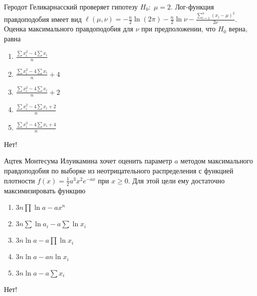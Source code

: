 \documentclass[t]{beamer}
\begin{document}
 \begin{frame} \label{20-No} 
\begin{block}{20} 

Геродот Геликарнасский проверяет гипотезу $H_0: \; \mu=2$. Лог-функция правдоподобия имеет вид $\ell(\mu,\nu)=-\frac{n}{2}\ln (2\pi)-\frac{n}{2}\ln \nu -\frac{\sum_{i=1}^n(x_i-\mu)^2}{2\nu}$. Оценка максимального правдоподобия для $\nu$ при предположении, что $H_0$ верна, равна
 


 \end{block} 
\begin{enumerate} 
\item[] \hyperlink{20-No}{\beamergotobutton{} $\frac{\sum x_i^2 - 4\sum x_i}{n}$}
\item[] \hyperlink{20-Yes}{\beamergotobutton{} $\frac{\sum x_i^2 - 4\sum x_i}{n}+4$}
\item[] \hyperlink{20-No}{\beamergotobutton{} $\frac{\sum x_i^2 - 4\sum x_i}{n}+2$}
\item[] \hyperlink{20-No}{\beamergotobutton{} $\frac{\sum x_i^2 - 4\sum x_i+2}{n}$}
\item[] \hyperlink{20-No}{\beamergotobutton{} $\frac{\sum x_i^2 - 4\sum x_i+4}{n}$}
\end{enumerate} 

 \alert{Нет!} 
\end{frame} 


 \begin{frame} \label{21-No} 
\begin{block}{21} 

Ацтек Монтесума Илуикамина хочет оценить параметр $a$ методом максимального правдоподобия по выборке из неотрицательного распределения с функцией плотности $f(x)=\frac{1}{2}a^3x^2e^{-ax}$ при $x\geq 0$. Для этой цели ему достаточно максимизировать функцию
 


 \end{block} 
\begin{enumerate} 
\item[] \hyperlink{21-No}{\beamergotobutton{} $3n\prod \ln a - a x^n$}
\item[] \hyperlink{21-No}{\beamergotobutton{} $3n \sum \ln a_i - a \sum \ln x_i$}
\item[] \hyperlink{21-No}{\beamergotobutton{} $3n\ln a - a \prod \ln x_i$}
\item[] \hyperlink{21-No}{\beamergotobutton{} $3n \ln a - an \ln x_i$}
\item[] \hyperlink{21-Yes}{\beamergotobutton{} $3n \ln a - a \sum x_i$}
\end{enumerate} 

 \alert{Нет!} 
\end{frame} 
\end{document}
